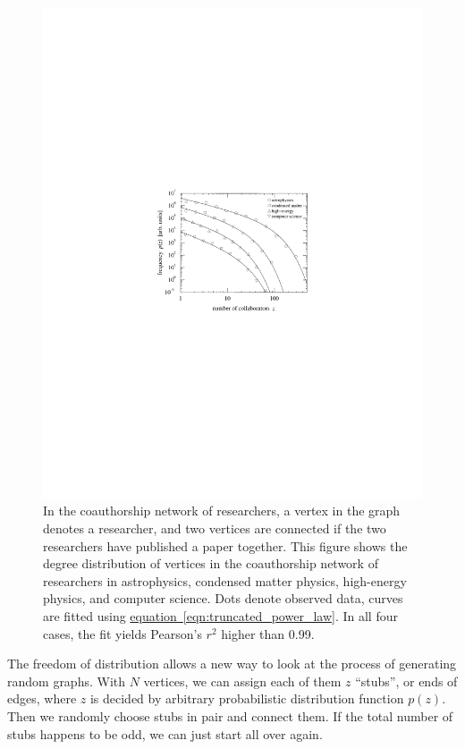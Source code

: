\documentclass[11pt,a4paper]{article}
\begin{document}
\begin{figure}[htbp]
	\centering
	\includegraphics[scale=1]{coauthorship.pdf}
	\caption{In the coauthorship network of researchers, a vertex in the graph denotes a researcher, and two vertices are connected if the two researchers have published a paper together. This figure shows the degree distribution of vertices in the coauthorship network of researchers in astrophysics, condensed matter physics, high-energy physics, and computer science. Dots denote observed data, curves are fitted using \hyperref[eqn:truncated_power_law]{equation~\ref{eqn:truncated_power_law}}. In all four cases, the fit yields Pearson's $r^2$ higher than 0.99.}
	\label{fig:coauthorship}
\end{figure}

The freedom of distribution allows a new way to look at the process of generating random graphs. With $N$ vertices, we can assign each of them $z$ ``stubs'', or ends of edges, where $z$ is decided by arbitrary probabilistic distribution function $p(z).$ Then we randomly choose stubs in pair and connect them. If the total number of stubs happens to be odd, we can just start all over again.
\end{document}
